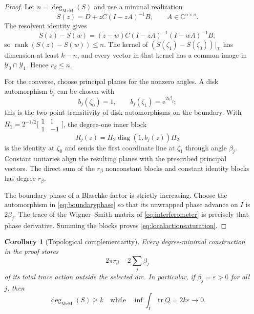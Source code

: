 \documentclass[11pt]{article}
\newtheorem{corollary}[theorem]{Corollary}
\theoremstyle{definition}
\theoremstyle{remark}
\newcommand{\C}{\mathbb C}
\newcommand{\tr}{\operatorname{tr}}
\newcommand{\rank}{\operatorname{rank}}
\newcommand{\diag}{\operatorname{diag}}
\newcommand{\e}{\mathrm e}
\newcommand{\mcdeg}{\deg_{\mathrm{McM}}}
\begin{document}
\begin{proof}
Let $n=\mcdeg(S)$ and use a minimal realization
\[
 S(z)=D+zC(I-zA)^{-1}B,
 \qquad A\in\C^{n\times n}.
\]
The resolvent identity gives
\begin{equation}\label{eq:rankdifference}
 S(z)-S(w)=(z-w)C(I-zA)^{-1}(I-wA)^{-1}B,
\end{equation}
so $\rank(S(z)-S(w))\leq n$.  The kernel of
$(S(\zeta_1)-S(\zeta_0))|_{\mathcal X}$ has dimension at least $k-n$, and
every vector in that kernel has a common image in
$\mathcal Y_0\cap\mathcal Y_1$.  Hence $r_\beta\leq n$.

For the converse, choose principal planes for the nonzero angles.  A disk
automorphism $b_j$ can be chosen with
\begin{equation}\label{eq:boundaryphase}
 b_j(\zeta_0)=1,
 \qquad b_j(\zeta_1)=\e^{2\mathrm i\beta_j};
\end{equation}
this is the two-point transitivity of disk automorphisms on the boundary.
With $H_2=2^{-1/2}\bigl[\begin{smallmatrix}1&1\\1&-1\end{smallmatrix}\bigr]$,
the degree-one inner block
\begin{equation}\label{eq:interferometer}
 R_j(z)=H_2\diag(1,b_j(z))H_2
\end{equation}
is the identity at $\zeta_0$ and sends the first coordinate line at
$\zeta_1$ through angle $\beta_j$.  Constant unitaries align the resulting
planes with the prescribed principal vectors.  The direct sum of the
$r_\beta$ nonconstant blocks and constant identity blocks has degree
$r_\beta$.

The boundary phase of a Blaschke factor is strictly increasing.  Choose the
automorphism in \eqref{eq:boundaryphase} so that its unwrapped phase advance
on $I$ is $2\beta_j$.  The trace of the Wigner--Smith matrix of
\eqref{eq:interferometer} is precisely that phase derivative.  Summing the
blocks proves \eqref{eq:localactionsaturation}.
\end{proof}

\begin{corollary}[Topological complementarity]\label{cor:complementarity}
Every degree-minimal construction in the proof stores
\begin{equation}\label{eq:outsidephase}
 2\pi r_\beta-2\sum_j\beta_j
\end{equation}
of its total trace action outside the selected arc.  In particular, if
$\beta_j=\varepsilon>0$ for all $j$, then
\begin{equation}\label{eq:vanishingaction}
 \mcdeg(S)\geq k
 \quad\text{while}\quad
 \inf\int_I\tr Q=2k\varepsilon\longrightarrow0.
\end{equation}
\end{corollary}
\end{document}
